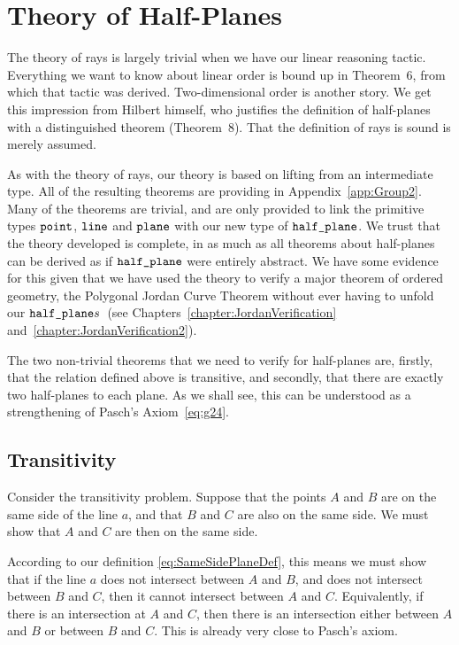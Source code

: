 \section{Theory of Half-Planes}\label{sec:HalfPlaneTheory}
The theory of rays is largely trivial when we have our linear reasoning tactic. Everything we want to know about linear order is bound up in Theorem~6, from which that tactic was derived. Two-dimensional order is another story. We get this impression from Hilbert himself, who justifies the definition of half-planes with a distinguished theorem (Theorem~8). That the definition of rays is sound is merely assumed.

As with the theory of rays, our theory is based on lifting from an intermediate type. All of the resulting theorems are providing in Appendix~\ref{app:Group2}. Many of the theorems are trivial, and are only provided to link the primitive types $\texttt{point}$, $\texttt{line}$ and $\texttt{plane}$ with our new type of $\texttt{half\_plane}$. We trust that the theory developed is complete, in as much as all theorems about half-planes can be derived as if $\texttt{half\_plane}$ were entirely abstract. We have some evidence for this given that we have used the theory to verify a major theorem of ordered geometry, the Polygonal Jordan Curve Theorem without ever having to unfold our $\texttt{half\_plane}s$~(see Chapters~\ref{chapter:JordanVerification} and~\ref{chapter:JordanVerification2}).

The two non-trivial theorems that we need to verify for half-planes are, firstly, that the relation defined above is transitive, and secondly, that there are exactly two half-planes to each plane. As we shall see, this can be understood as a strengthening of Pasch's Axiom~\eqref{eq:g24}.

\subsection{Transitivity}
Consider the transitivity problem. Suppose that the points $A$ and $B$ are on the same side of the line $a$, and that $B$ and $C$ are also on the same side. We must show that $A$ and $C$ are then on the same side.

According to our definition \eqref{eq:SameSidePlaneDef}, this means we must show that if the line $a$ does not intersect between $A$ and $B$, and does not intersect between $B$ and $C$, then it cannot intersect between $A$ and $C$. Equivalently, if there is an intersection at $A$ and $C$, then there is an intersection either between $A$ and $B$ or between $B$ and $C$. This is already very close to Pasch's axiom.

